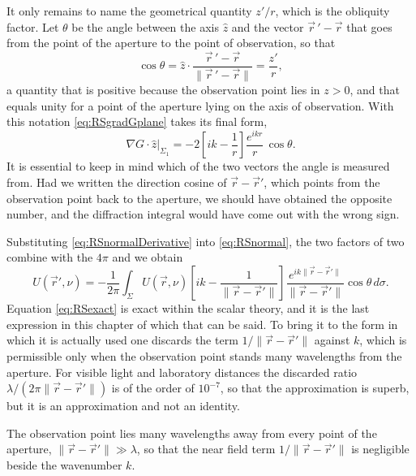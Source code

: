 		It only remains to name the geometrical quantity $z'/r$, which is the obliquity factor. Let $\theta$ be the angle between the axis $\hat{z}$ and the vector $\vec{r}\,'-\vec{r}$ that goes from the point of the aperture to the point of observation, so that
		\begin{equation}\label{eq:RSobliquity}
			\cos\theta = \hat{z}\cdot\dfrac{\vec{r}\,'-\vec{r}}{\|\vec{r}\,'-\vec{r}\|} = \dfrac{z'}{r} ,
		\end{equation}
		a quantity that is positive because the observation point lies in $z>0$, and that equals unity for a point of the aperture lying on the axis of observation. With this notation \eqref{eq:RSgradGplane} takes its final form,
		\begin{equation}\label{eq:RSnormalDerivative}
			\left.\nabla G\cdot\hat{z}\right|_{\Sigma_{1}} = -2\left[ik-\dfrac{1}{r}\right]\dfrac{e^{ikr}}{r}\,\cos\theta .
		\end{equation}
		It is essential to keep in mind which of the two vectors the angle is measured from. Had we written the direction cosine of $\vec{r}-\vec{r}'$, which points from the observation point back to the aperture, we should have obtained the opposite number, and the diffraction integral would have come out with the wrong sign.

		Substituting \eqref{eq:RSnormalDerivative} into \eqref{eq:RSnormal}, the two factors of two combine with the $4\pi$ and we obtain
		\begin{equation}\label{eq:RSexact}
			U(\vec{r}',\nu) = -\dfrac{1}{2\pi} \int_{\Sigma} U(\vec{r},\nu) \left[ik - \dfrac{1}{\|\vec{r} - \vec{r}'\|} \right] \dfrac{e^{ik\|\vec{r}-\vec{r}'\|}}{\|\vec{r}-\vec{r}'\|} \cos\theta\,d\sigma .
		\end{equation}
		Equation \eqref{eq:RSexact} is exact within the scalar theory, and it is the last expression in this chapter of which that can be said. To bring it to the form in which it is actually used one discards the term $1/\|\vec{r}-\vec{r}'\|$ against $k$, which is permissible only when the observation point stands many wavelengths from the aperture. For visible light and laboratory distances the discarded ratio $\lambda/(2\pi\|\vec{r}-\vec{r}'\|)$ is of the order of $10^{-7}$, so that the approximation is superb, but it is an approximation and not an identity.

		\begin{Assumption}
			The observation point lies many wavelengths away from every point of the aperture, $\|\vec{r}-\vec{r}'\| \gg \lambda$, so that the near field term $1/\|\vec{r}-\vec{r}'\|$ is negligible beside the wavenumber $k$.
		\end{Assumption}

